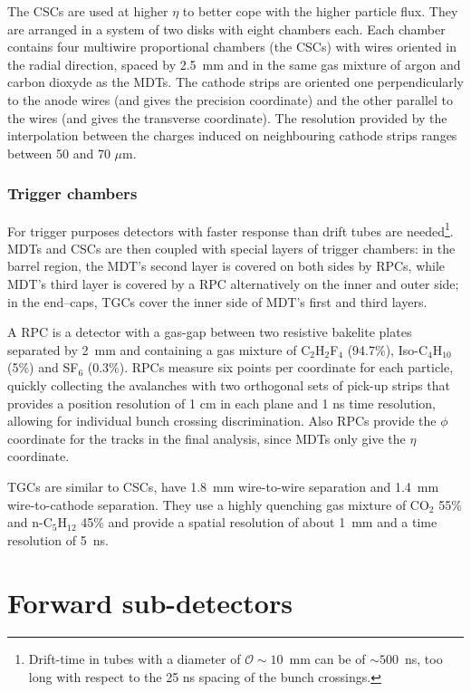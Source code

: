 The CSCs are used at higher $\eta$ to better cope with the higher particle flux.
They are arranged in a system of two disks with eight chambers each. Each chamber
contains four multiwire proportional chambers (the CSCs) with wires oriented in the radial direction,
spaced by 2.5~mm and in the same gas mixture of argon and carbon dioxyde as the MDTs.
The cathode strips are oriented one perpendicularly to the anode wires (and gives the precision coordinate)
and the other parallel to the wires (and gives the transverse coordinate).
The resolution provided by the interpolation between the charges induced on neighbouring cathode strips
ranges between 50 and 70 $\mu$m.

\subsubsection{Trigger chambers}

For trigger purposes detectors with faster response than drift tubes are needed\footnote{Drift-time in tubes with a diameter of 
$\mathcal{O}\sim 10$~mm can be of $\sim500$~ns, too long with respect to the 25 ns spacing of the bunch crossings.}.
MDTs and CSCs are then coupled with special layers of trigger chambers: in the barrel region, the MDT's second layer
is covered on both sides by RPCs, while MDT's third layer is covered by a RPC alternatively on the inner and outer side;
in the end–caps, TGCs cover the inner side of MDT's first and third layers. 

A RPC is a detector with a gas-gap between two resistive bakelite plates separated by 2~mm and containing
a gas mixture of C$_{2}$H$_{2}$F$_{4}$ (94.7\%), Iso-C$_{4}$H$_{10}$ (5\%) and SF$_{6}$ (0.3\%). 
RPCs measure six points per coordinate for each particle, quickly collecting the avalanches with two 
orthogonal sets of pick-up strips that provides a position resolution of 1 cm in each plane and 1 ns time resolution,
allowing for individual bunch crossing discrimination. Also RPCs provide the $\phi$ coordinate for the tracks in
the final analysis, since MDTs only give the $\eta$ coordinate.

TGCs are similar to CSCs, have 1.8~mm wire-to-wire separation and 
1.4~mm wire-to-cathode separation. They use a highly quenching gas mixture of CO$_{2}$ 55\% and n-C$_{5}$H$_{12}$ 45\%
and provide  a spatial resolution of about 1~mm and a time resolution of 5~ns.

\section{Forward sub-detectors}\label{sec:forward}

